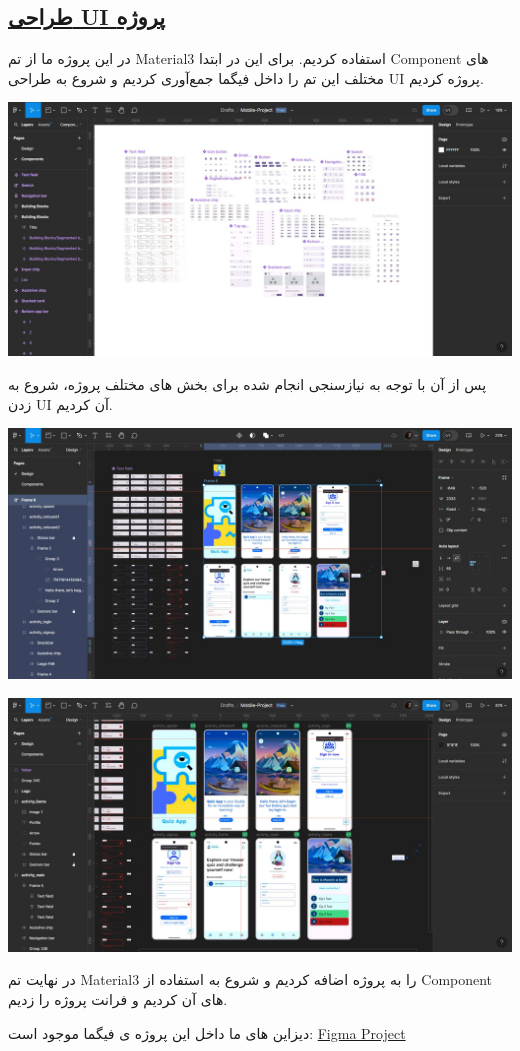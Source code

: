 \subsection*{\underline{طراحی UI پروژه}}

در این پروژه ما از تم Material3 استفاده کردیم. برای این در ابتدا Component های مختلف این تم را داخل فیگما جمع‌آوری کردیم و شروع به طراحی UI پروژه کردیم.



\includegraphics[width=1\linewidth]{figs/1}




پس از آن با توجه به نیازسنجی انجام شده برای بخش های مختلف پروژه، شروع به زدن UI آن کردیم.


\includegraphics[width=1\linewidth]{figs/2}

\includegraphics[width=1\linewidth]{figs/3}

در نهایت تم Material3 را به پروژه اضافه کردیم و شروع به استفاده از Component های آن کردیم و فرانت پروژه را زدیم.


دیزاین های ما داخل این پروژه ی فیگما موجود است:
\href{https://www.figma.com/design/SNXPfXCwEaH4mfpgiuE182/Mobile-Project?node-id=0-1&t=ZU7eZkuFNwZp494n-1}{Figma Project}